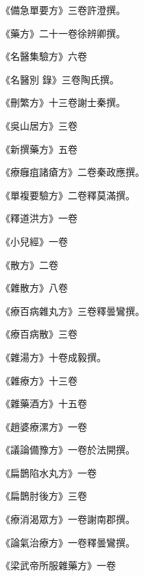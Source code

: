 \begin{pinyinscope}
 《備急單要方》三卷許澄撰。



 《藥方》二十一卷徐辨卿撰。



 《名醫集驗方》六卷



 《名醫別
 錄》三卷陶氏撰。



 《刪繁方》十三卷謝士秦撰。



 《吳山居方》三卷



 《新撰藥方》五卷



 《療癰疽諸瘡方》二卷秦政應撰。



 《單複要驗方》二卷釋莫滿撰。



 《釋道洪方》一卷



 《小兒經》一卷



 《散方》二卷



 《雜散方》八卷



 《療百病雜丸方》三卷釋曇鸞撰。



 《療百病散》三卷



 《雜湯方》十卷成毅撰。



 《雜療方》十三卷



 《雜藥酒方》十五卷



 《趙婆療漯方》一卷



 《議論備豫方》一卷於法開撰。



 《扁鵲陷水丸方》一卷



 《扁鵲肘後方》三卷



 《療消渴眾方》一卷謝南郡撰。



 《論氣治療方》一卷釋曇鸞撰。



 《梁武帝所服雜藥方》一卷




\end{pinyinscope}
